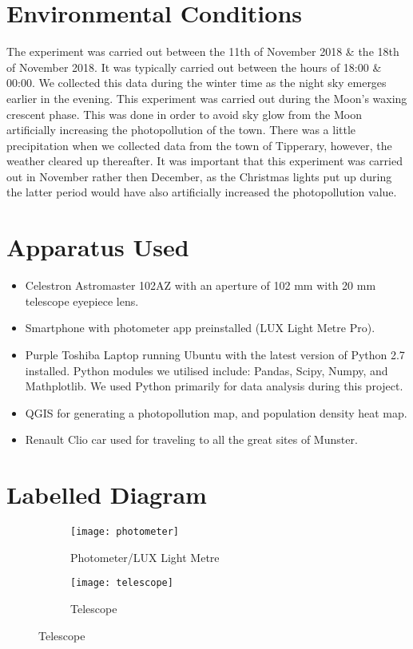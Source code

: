 \section{Environmental Conditions}
The experiment was carried out between the 11th of November 2018 \& the 18th of November 2018. It was typically carried out between the hours of 18:00 \& 00:00. We collected this data during the winter time as the night sky emerges earlier in the evening. This experiment was carried out during the Moon's waxing crescent phase. This was done in order to avoid sky glow from the Moon artificially increasing the photopollution of the town. There was a little precipitation when we collected data from the town of Tipperary, however, the weather cleared up thereafter. It was important that this experiment was carried out in November rather then December, as the Christmas lights put up during the latter period would have also artificially increased the photopollution value. 

\section{Apparatus Used} 
\begin{itemize}
\item Celestron Astromaster 102AZ  with an aperture of 102 mm with 20 mm telescope eyepiece lens.\cite{telescope}
\item Smartphone with photometer app preinstalled (LUX Light Metre Pro).\cite{photometer}
\item Purple Toshiba Laptop running Ubuntu with the latest version of Python 2.7 installed. Python modules we utilised include: Pandas, Scipy, Numpy, and Mathplotlib. We used Python primarily for data analysis during this project.\cite{purple_toshiba}\cite{python}\cite{scipy}
\item QGIS for generating a photopollution map, and population density heat map.\cite{QGIS_software}
\item Renault Clio car used for traveling to all the great sites of Munster.\cite{fab}
\end{itemize}

\section{Labelled Diagram}
\begin{figure}[H]
    \centering
    \begin{subfigure}{.48\textwidth}
        \centering
        \texttt{[image: photometer]}
        \caption{Photometer/LUX Light Metre}
    \end{subfigure}
    \hfill
    \begin{subfigure}{.48\textwidth}
        \centering
        \texttt{[image: telescope]}
        \caption{Telescope}
    \end{subfigure}
\end{figure}

